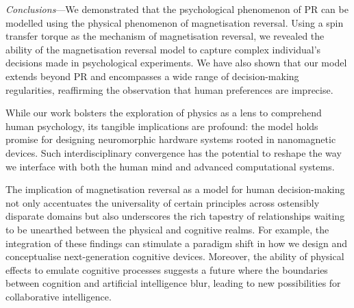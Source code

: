\documentclass[aps,prl,reprint,superscriptaddress]{revtex4-2}
\begin{document}
{\it Conclusions}---We demonstrated that the psychological phenomenon of PR can be modelled using the physical phenomenon of magnetisation reversal. Using a spin transfer torque as the mechanism of magnetisation reversal, we revealed the ability of the magnetisation reversal model to capture complex individual's decisions made in psychological experiments. We have also shown that our model extends beyond PR and encompasses a wide range of decision-making regularities, reaffirming the observation that human preferences are imprecise.

While our work bolsters the exploration of physics as a lens to comprehend human psychology, its tangible implications are profound: the model holds promise for designing neuromorphic hardware systems rooted in nanomagnetic devices. Such interdisciplinary convergence has the potential to reshape the way we interface with both the human mind and advanced computational systems.

The implication of magnetisation reversal as a model for human decision-making not only accentuates the universality of certain principles across ostensibly disparate domains but also underscores the rich tapestry of relationships waiting to be unearthed between the physical and cognitive realms. For example, the integration of these findings can stimulate a paradigm shift in how we design and conceptualise next-generation cognitive devices. Moreover, the ability of physical effects to emulate cognitive processes suggests a future where the boundaries between cognition and artificial intelligence blur, leading to new possibilities for collaborative intelligence.
\end{document}
